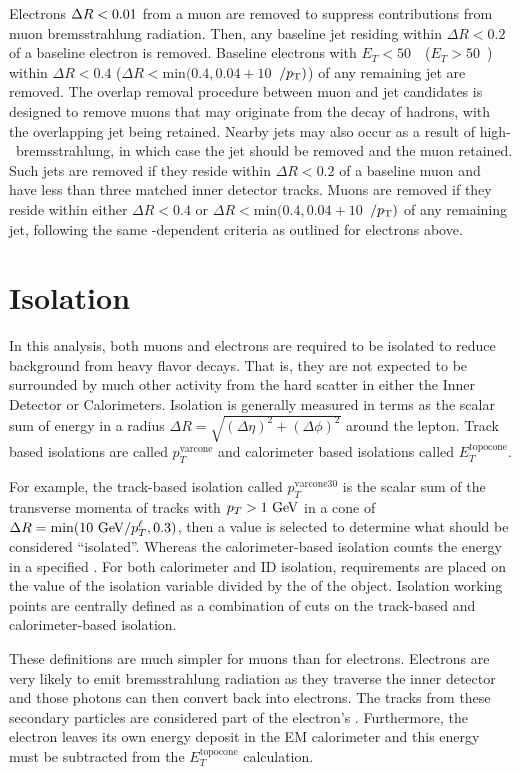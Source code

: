 Electrons $\Delta R < 0.01$ from a muon are removed to suppress contributions from muon bremsstrahlung radiation. Then, any baseline jet residing within $\Delta R < 0.2$ of a baseline electron is removed.  Baseline electrons with $E_{T}<50$~\GeV\ ($E_{T}>50$~\GeV) within $\Delta R < 0.4$ ($\Delta R < \mathrm{min}(0.4,0.04+10$~\GeV$/p_{\text{T}})$) of any remaining jet are removed. The overlap removal procedure between muon and jet candidates is designed to remove muons that may originate from the decay of hadrons, with the overlapping jet being retained. Nearby jets may also occur as a result of high-\pt\ bremsstrahlung, in which case the jet should be removed and the muon retained. Such jets are removed if they reside within $\Delta R < 0.2$ of a baseline muon and have less than three matched inner detector tracks. Muons are removed if they reside within either $\Delta R < 0.4$ or $\Delta R < \mathrm{min}(0.4,0.04+10$~\GeV$/p_{\text{T}})$ of any remaining jet, following the same \pt-dependent criteria as outlined for electrons above.


\section{Isolation}
\label{sec:isolation}

In this analysis, both muons and electrons are required to be isolated to reduce background from heavy flavor decays. That is, they are not expected to be surrounded by much other activity from the hard scatter in either the Inner Detector or Calorimeters. Isolation is generally measured in terms as the scalar sum of energy in a radius $\Delta R = \sqrt{(\Delta \eta)^2 + (\Delta \phi)^2}$ around the lepton. Track based isolations are called $p_{T}^{\textrm{varcone}}$ and calorimeter based isolations called $E_{T}^{\textrm{topocone}}$. 

For example, the track-based isolation called $p_{T}^{\textrm{varcone30}}$ is the scalar sum of the transverse momenta of tracks with $p_{T} > 1 \GeV$ in a cone of $\Delta R = \textrm{min}(10 \GeV/p_{T}^{\ell}, 0.3)$, then a value is selected to determine what should be considered ``isolated''. Whereas the calorimeter-based isolation counts the energy in a specified \dR. For both calorimeter and \ac{ID} isolation, requirements are placed on the value of the isolation variable divided by the \pt of the object. Isolation working points are centrally defined as a combination of cuts on the track-based and calorimeter-based isolation. 

These definitions are much simpler for muons than for electrons. Electrons are very likely to emit bremsstrahlung radiation as they traverse the inner detector and those photons can then convert back into electrons. The tracks from these secondary particles are considered part of the electron's \pT. Furthermore, the electron leaves its own energy deposit in the \ac{EM} calorimeter and this energy must be subtracted from the $E_{T}^{\textrm{topocone}}$ calculation.


